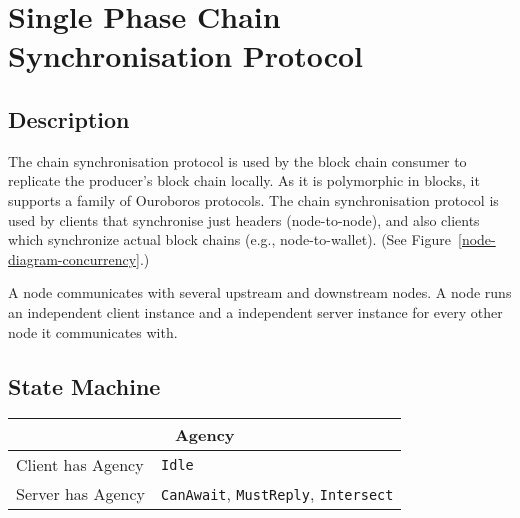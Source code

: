 \documentclass{report}
\newcommand{\hsref}[1]{}
\newcommand{\state}[1]{\texttt{#1}}
\newcommand{\msg}[1]{\texttt{#1}}
\newcommand{\Idle}{\state{Idle}}
\theoremstyle{definition}{
  \newtheorem{lemma}{Lemma}[section] %
  \newtheorem{definition}[lemma]{Definition}
}
\theoremstyle{theorem}{
  \newtheorem{invariant}[lemma]{Invariant}
  \newtheorem{proofobligation}[lemma]{Proof Obligation}
}
\numberwithin{equation}{lemma}
\begin{document}
\section{Single Phase Chain Synchronisation Protocol}
\label{chain-sync-protocol}
\hsref{ouroboros-network/src/Ouroboros/Network/Protocol/ChainSync/Type.hs}
\newcommand{\CanAwait}{\state{CanAwait}}
\newcommand{\MustReply}{\state{MustReply}}
\newcommand{\Intersect}{\state{Intersect}}
\newcommand{\RequestNext}{\msg{RequestNext}}
\newcommand{\AwaitReply}{\msg{AwaitReply}}
\newcommand{\RollForward}{\msg{RollForward}}
\newcommand{\RollBackward}{\msg{RollBackward}}
\newcommand{\FindIntersect}{\msg{FindIntersect}}
\newcommand{\IntersectImproved}{\msg{IntersectImproved}}
\newcommand{\IntersectUnchanged}{\msg{IntersectUnchanged}}

\subsection{Description}
The chain synchronisation protocol is used by the block chain consumer
to replicate the producer's block chain locally. As it is polymorphic in blocks,
it supports a family of Ouroboros protocols.
The chain synchronisation protocol is used by clients that synchronise just headers (node-to-node),
and also clients which synchronize actual block chains (e.g., node-to-wallet).
(See Figure~\ref{node-diagram-concurrency}.)

A node communicates with several upstream and downstream nodes.
A node runs an independent client instance and a independent server instance for every
other node it communicates with.

\subsection{State Machine}

\begin{tabular}{|l|l|}
  \hline
  \multicolumn{2}{|c|}{Agency} \\ \hline
  Client has Agency & \Idle \\  \hline
  Server has Agency & \CanAwait, \MustReply, \Intersect \\ \hline
\end{tabular}
\end{document}

